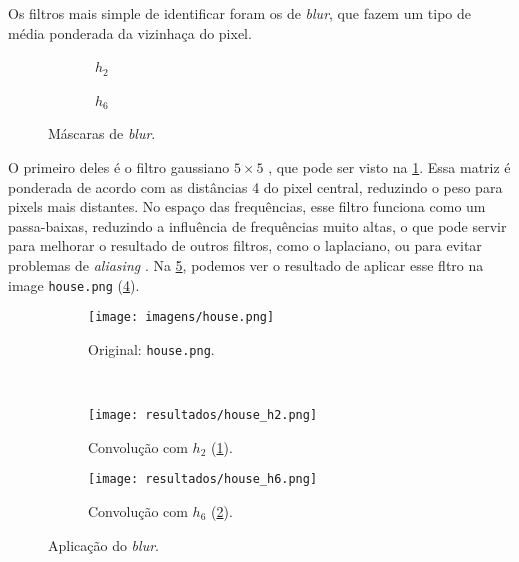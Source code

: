 Os filtros mais simple de identificar foram os de \textit{blur}, que fazem um tipo de média ponderada da vizinhaça do pixel.

\begin{figure}[H]
    \centering
    \begin{subfigure}{0.4\textwidth}
        \centering
        
        \caption{~$h_2$}
        \label{fig:h2}
    \end{subfigure}%
    \begin{subfigure}{0.4\textwidth}
        \centering
        
        \caption{~$h_6$}
        \label{fig:h6}
    \end{subfigure}

    \caption{Máscaras de \textit{blur}.}
    \label{fig:blur:kernel}
\end{figure}

O primeiro deles é o filtro gaussiano $5 \times 5$ \autocite{ref:gaussian}, que pode ser visto na \cref{fig:h2}. Essa matriz é ponderada de acordo com as distâncias 4 do pixel central, reduzindo o peso para pixels mais distantes. No espaço das frequências, esse filtro funciona como um passa-baixas, reduzindo a influência de frequências muito altas, o que pode servir para melhorar o resultado de outros filtros, como o laplaciano, ou para evitar problemas de \textit{aliasing} \autocite{ref:gaussian-lowpass}. Na \cref{fig:blur:gauss}, podemos ver o resultado de aplicar esse fltro na image \texttt{house.png} (\ref{fig:blur:orig}).

\begin{figure}[H]
    \centering
    \begin{subfigure}{0.48\textwidth}
        \centering
        \texttt{[image: imagens/house.png]}
        \caption{Original: \texttt{house.png}.}
        \label{fig:blur:orig}
    \end{subfigure}\\[8pt]
    \begin{subfigure}{0.48\textwidth}
        \centering
        \texttt{[image: resultados/house\_h2.png]}
        \caption{Convolução com $h_2$ (\ref{fig:h2}).}
        \label{fig:blur:gauss}
    \end{subfigure}%
    \begin{subfigure}{0.48\textwidth}
        \centering
        \texttt{[image: resultados/house\_h6.png]}
        \caption{Convolução com $h_6$ (\ref{fig:h6}).}
        \label{fig:blur:box}
    \end{subfigure}

    \caption{Aplicação do \textit{blur}.}
    \label{fig:blur}
\end{figure}

